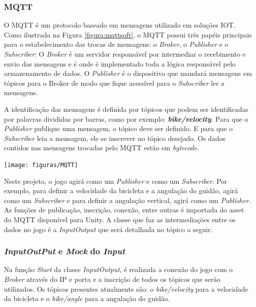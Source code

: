 \subsubsection{MQTT}

O MQTT é um protocolo baseado em mensagens utilizado em soluções IOT. Como ilustrada na Figura \ref{figura:mqttsoft}, o MQTT possui três papéis principais para o estabelecimento das trocas de mensagens: o \textit{Broker}, o \textit{Publisher} e o \textit{Subscriber}: O \textit{Broker} é um servidor responsável por intermediar o recebimento e envio das mensagens e é onde é implementado toda a lógica responsável pelo armazenamento de dados. O \textit{Publisher} é o dispositivo que mandará mensagens em tópicos para o Broker de modo que fique acessível para o \textit{Subscriber} ler a mensagens.

A identificação das mensagens é definida por tópicos que podem ser identificadas por palavras divididas por barras, como por exemplo: \textit{\textbf{bike/velocity}}. Para que o \textit{Publisher} publique uma mensagem, o tópico deve ser definido. E para que o \textit{Subscriber} leia a mensagem, ele se inscrever no tópico desejado. Os dados contidos nas mensagens trocadas pelo MQTT estão em \textit{bytecode}.

\begin{center}
	\texttt{[image: figuras/MQTT]}
	\label{figura:mqttsoft}
\end{center}


Neste projeto, o jogo agirá como um \textit{Publisher} e como um \textit{Subscriber}. Por exemplo, para definir a velocidade da bicicleta e a angulação do guidão, agirá como um \textit{Subscriber} e para definir a angulação vertical, agirá como um \textit{Publisher}. As funções de publicação, inscrição, conexão, entre outras é importada do asset do MQTT disponível para Unity.  A classe que faz as intermediações entre os dados no jogo é a \textit{InputOutput} que será detalhada no tópico a seguir.

\subsubsection{\textit{InputOutPut} e \textit{Mock} do \textit{Input}}

Na função \textit{Start} da classe  \textit{InputOutput}, é realizada a conexão do jogo com o \textit{Broker} através do IP e porta e a inscrição de todos os tópicos que serão utilizados. Os tópicos presentes atualmente são: o \textit{bike/velocity} para a velocidade da bicicleta e o \textit{bike/angle} para a angulação do guidão.

